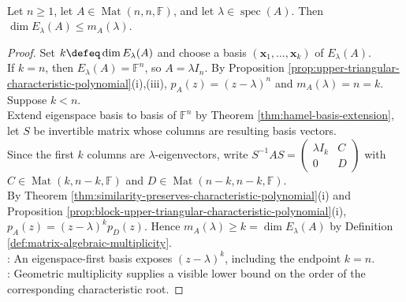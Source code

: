 \begin{theorem} \label{thm:geometric-multiplicity-bounded-by-algebraic-multiplicity} \\
Let $n\geq1$, let $A\in\operatorname{Mat}(n,n,\mathbb{F})$, and let $\lambda\in\operatorname{spec}(A)$. Then $\dim E_{\lambda}(A)\leq m_A(\lambda)$.
\begin{proof}
Set $k\defeq\dim E_{\lambda}(A)$ and choose a basis $(\mathbf{x}_1,\ldots,\mathbf{x}_k)$ of $E_{\lambda}(A)$.\\
If $k=n$, then $E_{\lambda}(A)=\mathbb{F}^n$, so $A=\lambda I_n$. By Proposition \ref{prop:upper-triangular-characteristic-polynomial}(i),(iii), $p_A(z)=(z-\lambda)^n$ and $m_A(\lambda)=n=k$. Suppose $k<n$.\\
Extend eigenspace basis to basis of $\mathbb{F}^n$ by Theorem \ref{thm:hamel-basis-extension}, let $S$ be invertible matrix whose columns are resulting basis vectors.\\
Since the first $k$ columns are $\lambda$-eigenvectors, write $S^{-1}AS=\left(\begin{smallmatrix}\lambda I_k&C\\0&D\end{smallmatrix}\right)$ with $C\in\operatorname{Mat}(k,n-k,\mathbb{F})$ and $D\in\operatorname{Mat}(n-k,n-k,\mathbb{F})$.\\
By Theorem \ref{thm:similarity-preserves-characteristic-polynomial}(i) and Proposition \ref{prop:block-upper-triangular-characteristic-polynomial}(i), $p_A(z)=(z-\lambda)^kp_D(z)$. Hence $m_A(\lambda)\geq k=\dim E_{\lambda}(A)$ by Definition \ref{def:matrix-algebraic-multiplicity}.\\
: An eigenspace-first basis exposes $(z-\lambda)^k$, including the endpoint $k=n$.\\
: Geometric multiplicity supplies a visible lower bound on the order of the corresponding characteristic root.
\end{proof}
\end{theorem}

